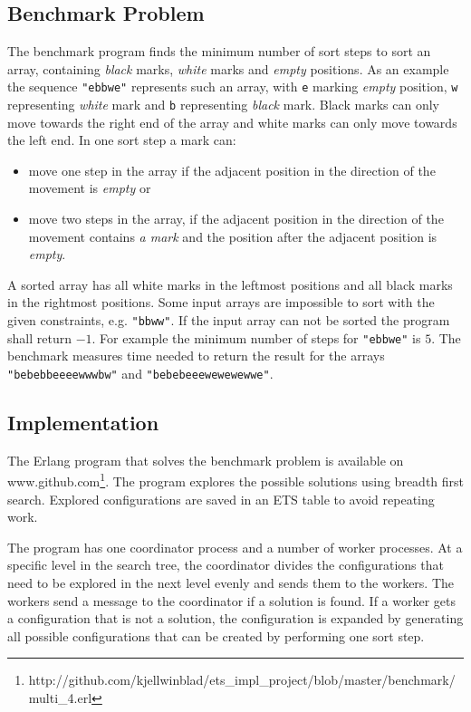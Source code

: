 \documentclass[aps,pre,preprint,nofootinbib]{revtex4}
\begin{document}
\subsection{Benchmark Problem}
The benchmark program finds the minimum number of sort steps to sort an array, containing \emph{black} marks, \emph{white} marks and \emph{empty} positions.
As an example the sequence \verb|"ebbwe"| represents such an array, with \verb|e| marking \emph{empty} position, \verb|w| representing \emph{white} mark and \verb|b| representing \emph{black} mark.
Black marks can only move towards the right end of the array and white marks can only move towards the left end.
In one sort step a mark can:
\begin{itemize}
\item move one step in the array if the adjacent position in the direction of the movement is \emph{empty} or
\item move two steps in the array, if the adjacent position in the direction of the movement contains \emph{a mark} and the position after the adjacent position is \emph{empty}.
\end{itemize}
A sorted array has all white marks in the leftmost positions and all black marks in the rightmost positions.
Some input arrays are impossible to sort with the given constraints, e.g. \verb|"bbww"|.
If the input array can not be sorted the program shall return $-1$.
For example the minimum number of steps for \verb|"ebbwe"| is $5$.
The benchmark measures time needed to return the result for the arrays \verb|"bebebbeeeewwwbw"| and \verb|"bebebeeewewewewwe"|.

\subsection{Implementation}
The Erlang program that solves the benchmark problem is available on www.github.com\footnote{http://github.com/kjellwinblad/ets\_impl\_project/blob/master/benchmark/multi\_4.erl}.
The program explores the possible solutions using breadth first search.
Explored configurations are saved in an ETS table to avoid repeating work.

The program has one coordinator process and a number of worker processes.
At a specific level in the search tree, the coordinator divides the configurations that need to be explored in the next level evenly and sends them to the workers.
The workers send a message to the coordinator if a solution is found.
If a worker gets a configuration that is not a solution, the configuration is expanded by generating all possible configurations that can be created by performing one sort step.
\end{document}
